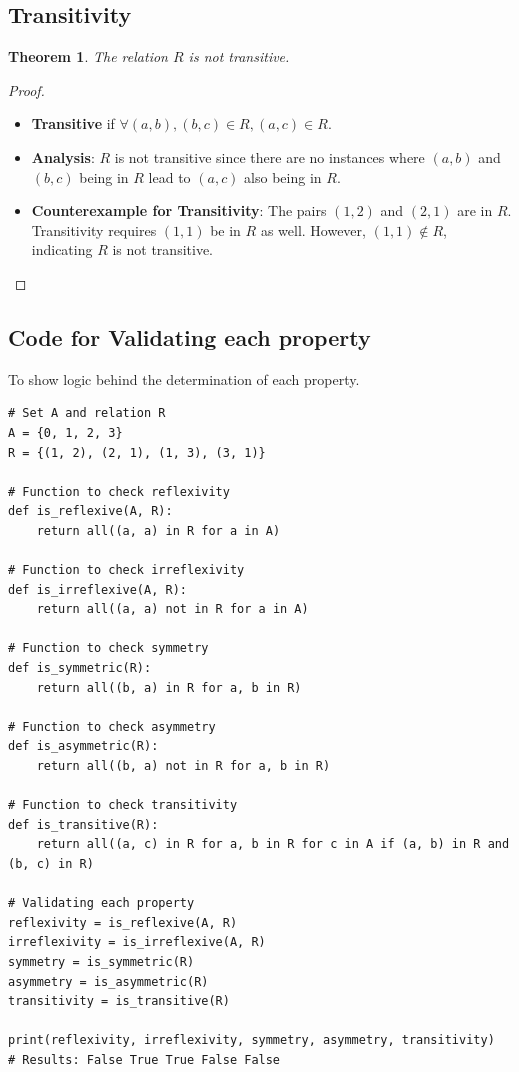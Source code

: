 \documentclass[12pt]{article}
\newtheorem{theorem}{Theorem}
\begin{document}
\subsection{Transitivity}
\begin{theorem}
The relation \( R \) is not transitive.
\end{theorem}
\begin{proof}
\begin{itemize}
    \item \textbf{Transitive} if \(\forall (a, b), (b, c) \in R, (a, c) \in R\).
    \item \textbf{Analysis}: \( R \) is not transitive since there are no instances where \((a, b)\) and \((b, c)\) being in \( R \) lead to \((a, c)\) also being in \( R \).
    \item \textbf{Counterexample for Transitivity}: The pairs \( (1,2) \) and \( (2,1) \) are in \( R \). Transitivity requires \( (1,1) \) be in \( R \) as well. However, \( (1,1) \notin R \), indicating \( R \) is not transitive.
\end{itemize}
\end{proof}

\subsection{Code for Validating each property} To show logic behind the determination of each property.
\begin{lstlisting}
# Set A and relation R
A = {0, 1, 2, 3}
R = {(1, 2), (2, 1), (1, 3), (3, 1)}

# Function to check reflexivity
def is_reflexive(A, R):
    return all((a, a) in R for a in A)

# Function to check irreflexivity
def is_irreflexive(A, R):
    return all((a, a) not in R for a in A)

# Function to check symmetry
def is_symmetric(R):
    return all((b, a) in R for a, b in R)

# Function to check asymmetry
def is_asymmetric(R):
    return all((b, a) not in R for a, b in R)

# Function to check transitivity
def is_transitive(R):
    return all((a, c) in R for a, b in R for c in A if (a, b) in R and (b, c) in R)

# Validating each property
reflexivity = is_reflexive(A, R)
irreflexivity = is_irreflexive(A, R)
symmetry = is_symmetric(R)
asymmetry = is_asymmetric(R)
transitivity = is_transitive(R)

print(reflexivity, irreflexivity, symmetry, asymmetry, transitivity)
# Results: False True True False False
\end{lstlisting}
\end{document}
